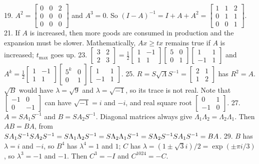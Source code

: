 19. \(A^{2}=\begin{bmatrix}0&0&2\\ 0&0&0\\ 0&0&0\end{bmatrix}\) and \(A^{3}=0\). So \((I-A)^{-1}=I+A+A^{2}=\begin{bmatrix}1&1&2\\ 0&1&1\\ 0&0&1\end{bmatrix}\).
21. If \(A\) is increased, then more goods are consumed in production and the expansion must be slower. Mathematically, \(Ax\geq tx\) remains true if \(A\) is increased; \(t_{\max}\) goes up.
23. \(\begin{bmatrix}3&2\\ 2&3\end{bmatrix}=\frac{1}{2}\begin{bmatrix}1&-1\\ 1&1\end{bmatrix}\begin{bmatrix}5&0\\ 0&1\end{bmatrix}\begin{bmatrix}1&1\\ -1&1\end{bmatrix}\) and \(A^{k}=\frac{1}{2}\begin{bmatrix}1&-1\\ 1&1\end{bmatrix}\begin{bmatrix}5^{k}&0\\ 0&1\end{bmatrix}\begin{bmatrix}1&1\\ -1&1\end{bmatrix}\).
25. \(R=S\sqrt{\Lambda}S^{-1}=\begin{bmatrix}2&1\\ 1&2\end{bmatrix}\) has \(R^{2}=A\). \(\sqrt{B}\) would have \(\lambda=\sqrt{9}\) and \(\lambda=\sqrt{-1}\), so its trace is not real. Note that \(\begin{bmatrix}-1&0\\ 0&-1\end{bmatrix}\) can have \(\sqrt{-1}=i\) and \(-i\), and real square root \(\begin{bmatrix}0&1\\ -1&0\end{bmatrix}\).
27. \(A=SA_{1}S^{-1}\) and \(B=SA_{2}S^{-1}\). Diagonal matrices always give \(\Lambda_{1}\Lambda_{2}=\Lambda_{2}\Lambda_{1}\). Then \(AB=BA\), from \(SA_{1}S^{-1}SA_{2}S^{-1}=S\Lambda_{1}\Lambda_{2}S^{-1}=S\Lambda_{2}\Lambda_{1}S ^{-1}=\\ S\Lambda_{2}S^{-1}SA_{1}S^{-1}=BA\).
29. \(B\) has \(\lambda=i\) and \(-i\), so \(B^{4}\) has \(\lambda^{4}=1\) and \(1\); \(C\) has \(\lambda=(1\pm\sqrt{3}i)/2=\exp(\pm\pi i/3)\), so \(\lambda^{3}=-1\) and \(-1\). Then \(C^{3}=-I\) and \(C^{1024}=-C\).

